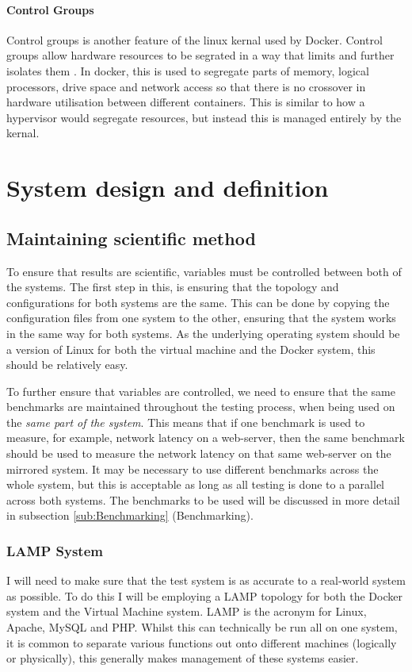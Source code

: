 \subsubsection{Control Groups}
Control groups is another feature of the linux kernal used by Docker. Control groups allow hardware resources to be segrated in a way that limits and further isolates them \citep{corbetControlGroups}. In docker, this is used to segregate parts of memory, logical processors, drive space and network access so that there is no crossover in hardware utilisation between different containers. This is similar to how a hypervisor would segregate resources, but instead this is managed entirely by the kernal.

\chapter{System design and definition}


\section{Maintaining scientific method}
To ensure that results are scientific, variables must be controlled between both of the systems. The first step in this, is ensuring that the topology and configurations for both systems are the same. This can be done by copying the configuration files from one system to the other, ensuring that the system works in the same way for both systems. As the underlying operating system should be a version of Linux for both the virtual machine and the Docker system, this should be relatively easy.

To further ensure that variables are controlled, we need to ensure that the same benchmarks are maintained throughout the testing process, when being used on the \emph{same part of the system}. This means that if one benchmark is used to measure, for example, network latency on a web-server, then the same benchmark should be used to measure the network latency on that same web-server on the mirrored system. It may be necessary to use different benchmarks across the whole system, but this is acceptable as long as all testing is done to a parallel across both systems. The benchmarks to be used will be discussed in more detail in subsection \ref{sub:Benchmarking} (Benchmarking).

\subsection{LAMP System}
I will need to make sure that the test system is as accurate to a real-world system as possible. To do this I will be employing a LAMP topology for both the Docker system and the Virtual Machine system. LAMP is the acronym for Linux, Apache, MySQL and PHP. Whilst this can technically be run all on one system, it is common to separate various functions out onto different machines (logically or physically), this generally makes management of these systems easier.

